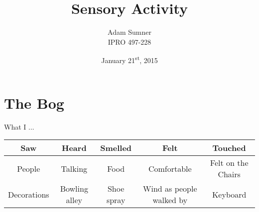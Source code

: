 \documentclass[12pt]{article}
\title{\textbf{Sensory Activity}}
\author{Adam Sumner \\ IPRO 497-228}
\date{January 21\textsuperscript{st}, 2015}
\begin{document}
\maketitle

\section*{The Bog}
What I ...
\begin{center}
	\begin{tabular}{||c||c||c||c||c||}
		\hline
		\textbf{Saw} & \textbf{Heard} & \textbf{Smelled} & \textbf{Felt} & \textbf{Touched} \\ \hline \hline
		People & Talking  & Food  & Comfortable  & Felt on the Chairs \\ \hline
		Decorations & Bowling alley & Shoe spray  & Wind as people walked by  & Keyboard \\ \hline
	\end{tabular}
\end{center}
\end{document}
